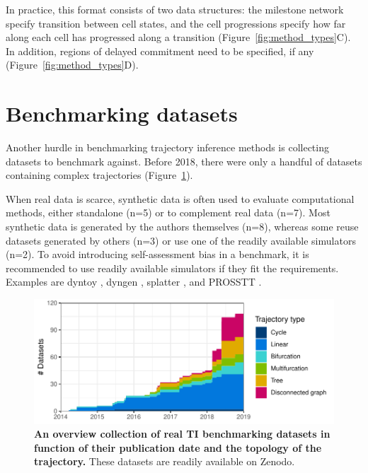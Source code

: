 
In practice, this format consists of two data structures: the milestone network specify transition between cell states, and the cell progressions specify how far along each cell has progressed along a transition (Figure~\ref{fig:method_types}C). In addition, regions of delayed commitment need to be specified, if any (Figure~\ref{fig:method_types}D). 


\section{Benchmarking datasets}
Another hurdle in benchmarking trajectory inference methods is collecting datasets to benchmark against. Before 2018, there were only a handful of datasets containing complex trajectories (Figure~\ref{fig:datasets}). 

When real data is scarce, synthetic data is often used to evaluate computational methods, either standalone (n=5) or to complement real data (n=7). Most synthetic data is generated by the authors themselves (n=8), whereas some reuse datasets generated by others (n=3) or use one of the readily available simulators (n=2). To avoid introducing self-assessment bias in a benchmark, it is recommended to use readily available simulators if they fit the requirements. Examples are dyntoy \cite{saelens_comparisonsinglecelltrajectory_2019}, dyngen \cite{dyngen}, splatter \cite{zappia_splattersimulationsinglecell_2017}, and PROSSTT \cite{papadopoulos_prossttprobabilisticsimulation_2018}.

\begin{figure}[htb!]
	\centering
	\includegraphics[width=.75\linewidth]{fig/datasets.pdf} 
	\caption{\textbf{An overview collection of real TI benchmarking datasets in function of their publication date and the topology of the trajectory.} These datasets are readily available on Zenodo\cite{cannoodt_singlecellomicsdatasets_2018}.}
	\label{fig:datasets}
\end{figure}

